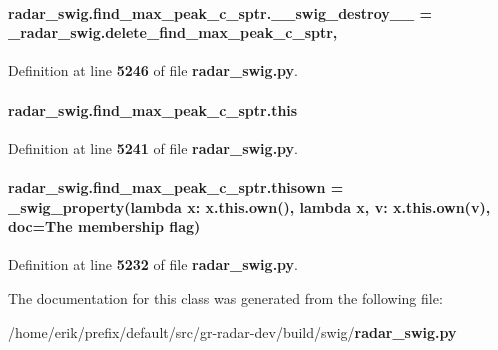 \paragraph[{\+\_\+\+\_\+swig\+\_\+destroy\+\_\+\+\_\+}]{\setlength{\rightskip}{0pt plus 5cm}radar\+\_\+swig.\+find\+\_\+max\+\_\+peak\+\_\+c\+\_\+sptr.\+\_\+\+\_\+swig\+\_\+destroy\+\_\+\+\_\+ = \+\_\+radar\+\_\+swig.\+delete\+\_\+find\+\_\+max\+\_\+peak\+\_\+c\+\_\+sptr\hspace{0.3cm}{\ttfamily [static]}, {\ttfamily [private]}}\label{classradar__swig_1_1find__max__peak__c__sptr_a933f59fcb527ca7d9551d994728fc370}


Definition at line {\bf 5246} of file {\bf radar\+\_\+swig.\+py}.

\paragraph[{this}]{\setlength{\rightskip}{0pt plus 5cm}radar\+\_\+swig.\+find\+\_\+max\+\_\+peak\+\_\+c\+\_\+sptr.\+this}\label{classradar__swig_1_1find__max__peak__c__sptr_af4a2e5f064a12cee84a0c3640134a2d4}


Definition at line {\bf 5241} of file {\bf radar\+\_\+swig.\+py}.

\paragraph[{thisown}]{\setlength{\rightskip}{0pt plus 5cm}radar\+\_\+swig.\+find\+\_\+max\+\_\+peak\+\_\+c\+\_\+sptr.\+thisown = {\bf \+\_\+swig\+\_\+property}(lambda x\+: x.\+this.\+own(), lambda {\bf x}, v\+: x.\+this.\+own(v), doc=\textquotesingle{}The membership flag\textquotesingle{})\hspace{0.3cm}{\ttfamily [static]}}\label{classradar__swig_1_1find__max__peak__c__sptr_a83a5f0ca3813299520e74b723c01a0ff}


Definition at line {\bf 5232} of file {\bf radar\+\_\+swig.\+py}.



The documentation for this class was generated from the following file\+:\begin{DoxyCompactItemize}
\item 
/home/erik/prefix/default/src/gr-\/radar-\/dev/build/swig/{\bf radar\+\_\+swig.\+py}\end{DoxyCompactItemize}

